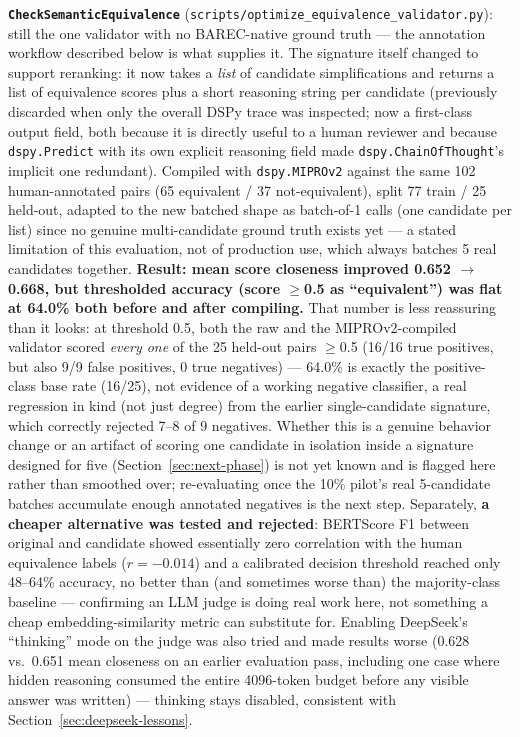\documentclass[11pt,a4paper]{article}
\begin{document}
\begin{noteb}
\textbf{\texttt{CheckSemanticEquivalence}} (\texttt{scripts/optimize\_equivalence\_validator.py}):
still the one validator with no BAREC-native ground truth --- the
annotation workflow described below is what supplies it. The signature
itself changed to support reranking: it now takes a \emph{list} of
candidate simplifications and returns a list of equivalence scores plus a
short reasoning string per candidate (previously discarded when only the
overall DSPy trace was inspected; now a first-class output field, both
because it is directly useful to a human reviewer and because
\texttt{dspy.Predict} with its own explicit reasoning field made
\texttt{dspy.ChainOfThought}'s implicit one redundant). Compiled with
\texttt{dspy.MIPROv2} against the same 102 human-annotated pairs (65
equivalent / 37 not-equivalent), split 77 train / 25 held-out, adapted to
the new batched shape as batch-of-1 calls (one candidate per list) since no
genuine multi-candidate ground truth exists yet --- a stated limitation of
this evaluation, not of production use, which always batches 5 real
candidates together. \textbf{Result: mean score closeness improved 0.652
$\to$ 0.668, but thresholded accuracy (score $\geq$0.5 as ``equivalent'')
was flat at 64.0\% both before and after compiling.} That number is less
reassuring than it looks: at threshold 0.5, both the raw and the
MIPROv2-compiled validator scored \emph{every one} of the 25 held-out
pairs $\geq$0.5 (16/16 true positives, but also 9/9 false positives, 0
true negatives) --- 64.0\% is exactly the positive-class base rate
(16/25), not evidence of a working negative classifier, a real regression
in kind (not just degree) from the earlier single-candidate signature,
which correctly rejected 7--8 of 9 negatives. Whether this is a genuine
behavior change or an artifact of scoring one candidate in isolation
inside a signature designed for five (Section~\ref{sec:next-phase}) is not
yet known and is flagged here rather than smoothed over; re-evaluating
once the 10\% pilot's real 5-candidate batches accumulate enough annotated
negatives is the next step. Separately, \textbf{a cheaper alternative was
tested and rejected}: BERTScore F1 between original and candidate showed
essentially zero correlation with the human equivalence labels
($r=-0.014$) and a calibrated decision threshold reached only 48--64\%
accuracy, no better than (and sometimes worse than) the majority-class
baseline --- confirming an LLM judge is doing real work here, not
something a cheap embedding-similarity metric can substitute for.
Enabling DeepSeek's ``thinking'' mode on the judge was also tried and made
results worse (0.628 vs.\ 0.651 mean closeness on an earlier evaluation
pass, including one case where hidden reasoning consumed the entire
4096-token budget before any visible answer was written) --- thinking
stays disabled, consistent with Section~\ref{sec:deepseek-lessons}.
\end{noteb}
\end{document}
